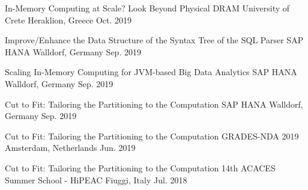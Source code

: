 

\begin{cvhonors}

  \cvhonor
    {In-Memory Computing at Scale? Look Beyond Physical DRAM} %
    {University of Crete} %
    {Heraklion, Greece} %
    {Oct. 2019} %

  \cvhonor
    {Improve/Enhance the Data Structure of the Syntax Tree of the SQL Parser} %
    {SAP HANA} %
    {Walldorf, Germany} %
    {Sep. 2019} %


  \cvhonor
    {Scaling In-Memory Computing for JVM-based Big Data Analytics} %
    {SAP HANA} %
    {Walldorf, Germany} %
    {Sep. 2019} %

  \cvhonor
    {Cut to Fit: Tailoring the Partitioning to the Computation} %
    {SAP HANA} %
    {Walldorf, Germany} %
    {Sep. 2019} %

  \cvhonor
    {Cut to Fit: Tailoring the Partitioning to the Computation} %
    {GRADES-NDA 2019} %
    {Amsterdam, Netherlands} %
    {Jun. 2019} %

  \cvhonor
    {Cut to Fit: Tailoring the Partitioning to the Computation} %
    {14th ACACES Summer School - HiPEAC} %
    {Fiuggi, Italy} %
    {Jul. 2018} %

\end{cvhonors}
